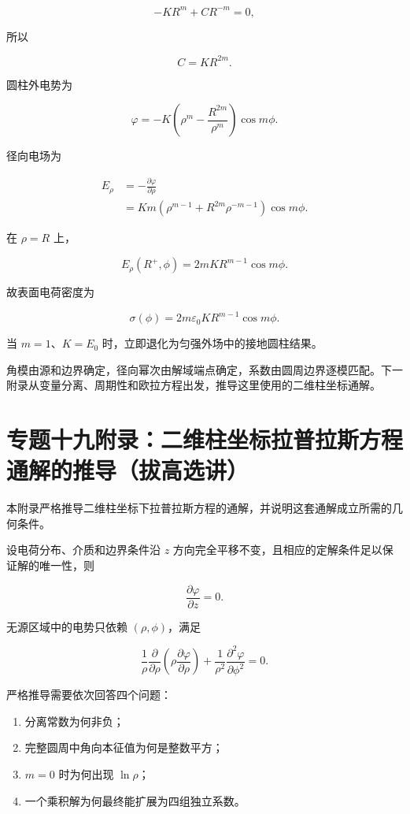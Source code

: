 \[
-KR^m+CR^{-m}=0,
\]

所以

\[
C=KR^{2m}.
\]

圆柱外电势为

\[
\boxed{
\varphi
=-K
\left(
\rho^m-\frac{R^{2m}}{\rho^m}
\right)\cos m\phi
}.
\]

径向电场为

\[
\begin{aligned}
E_{\rho}
&=-\frac{\partial\varphi}{\partial\rho}\\
&=Km
\left(
\rho^{m-1}
+R^{2m}\rho^{-m-1}
\right)\cos m\phi.
\end{aligned}
\]

在 \(\rho=R\) 上，

\[
E_{\rho}(R^+,\phi)
=2mKR^{m-1}\cos m\phi.
\]

故表面电荷密度为

\[
\boxed{
\sigma(\phi)
=2m\varepsilon_0KR^{m-1}\cos m\phi
}.
\]

当 \(m=1\)、\(K=E_0\) 时，立即退化为匀强外场中的接地圆柱结果。

角模由源和边界确定，径向幂次由解域端点确定，系数由圆周边界逐模匹配。下一附录从变量分离、周期性和欧拉方程出发，推导这里使用的二维柱坐标通解。

\section{专题十九附录：二维柱坐标拉普拉斯方程通解的推导（拔高选讲）}\label{m2:ux4e13ux9898ux5341ux4e5dux9644ux5f55ux4e8cux7ef4ux67f1ux5750ux6807ux62c9ux666eux62c9ux65afux65b9ux7a0bux901aux89e3ux7684ux63a8ux5bfcux62d4ux9ad8ux9009ux8bb2}

本附录严格推导二维柱坐标下拉普拉斯方程的通解，并说明这套通解成立所需的几何条件。

设电荷分布、介质和边界条件沿 \(z\)
方向完全平移不变，且相应的定解条件足以保证解的唯一性，则

\[
\frac{\partial\varphi}{\partial z}=0.
\]

无源区域中的电势只依赖 \((\rho,\phi)\)，满足

\[
\boxed{
\frac1\rho\frac{\partial}{\partial\rho}
\left(
\rho\frac{\partial\varphi}{\partial\rho}
\right)
+\frac1{\rho^2}
\frac{\partial^2\varphi}{\partial\phi^2}
=0
}.
\]

严格推导需要依次回答四个问题：

\begin{enumerate}
\def\labelenumi{\arabic{enumi}.}
\tightlist
\item
  分离常数为何非负；
\item
  完整圆周中角向本征值为何是整数平方；
\item
  \(m=0\) 时为何出现 \(\ln\rho\)；
\item
  一个乘积解为何最终能扩展为四组独立系数。
\end{enumerate}

